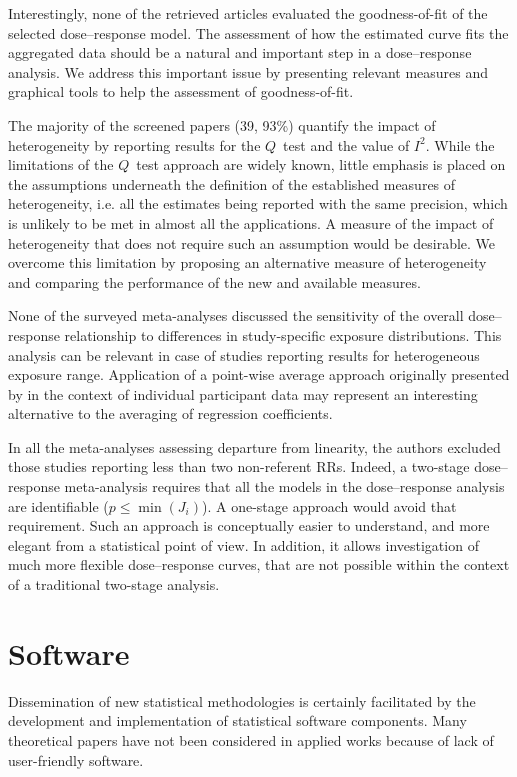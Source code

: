 \documentclass[11pt,a4paper,twoside,openany]{book}\usepackage{knitr}
\begin{document}
{{Interestingly, none of the retrieved articles evaluated the goodness-of-fit of the selected dose--response model. The assessment of how the estimated curve fits the aggregated data should be a natural and important step in a dose--response analysis. We address this important issue by presenting relevant measures and graphical tools to help the assessment of goodness-of-fit.

The majority of the screened papers (39, 93\%) quantify the impact of heterogeneity by reporting results for the $Q$~test and the value of $I^2$. While the limitations of the $Q$~test approach are widely known, little emphasis is placed on the assumptions underneath the definition of the established measures of heterogeneity, i.e.  all the estimates being reported with the same precision, which is unlikely to be met in almost all the applications. A measure of the impact of heterogeneity that does not require such an assumption would be desirable. We overcome this limitation by proposing an alternative measure of heterogeneity and comparing the performance of the new and available measures.

None of the surveyed meta-analyses discussed the sensitivity of the overall dose--response relationship to differences in study-specific exposure distributions. This analysis can be relevant in case of studies reporting results for heterogeneous exposure range. Application of a point-wise average approach originally presented by \cite{sauerbrei2011new} in the context of individual participant data may represent an interesting alternative to the averaging of regression coefficients. 

In all the meta-analyses assessing departure from linearity, the authors excluded those studies reporting less than two non-referent RRs. Indeed, a two-stage dose--response meta-analysis requires that all the models in the dose--response analysis are identifiable ($p \le \min\left(J_i\right)$). A one-stage approach would avoid that requirement. Such an approach is conceptually easier to understand, and more elegant from a statistical point of view. In addition, it allows investigation of much more flexible dose--response curves, that are not possible within the context of a traditional two-stage analysis.

\section{Software}

Dissemination of new statistical methodologies is certainly facilitated by the development and implementation of statistical software components. Many theoretical papers have not been considered in applied works because of lack of user-friendly software. 

}}
\end{document}
